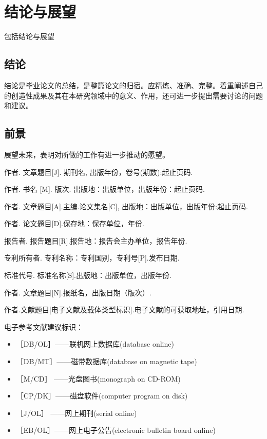 \documentclass[a4paper,fancyhdr,fntef,UTF8,hyperref,openany,oneside,notitlepage]{book}%
\begin{document}
\chapter{结论与展望}
包括结论与展望
\section{结论}
结论是毕业论文的总结，是整篇论文的归宿。应精炼、准确、完整。着重阐述自己的创造性成果及其在本研究领域中的意义、作用，还可进一步提出需要讨论的问题和建议。
\section{前景}
展望未来，表明对所做的工作有进一步推动的愿望。

\clearpage{}
{}
\begin{thebibliography}{00}

   作者. 文章题目[J]. 期刊名, 出版年份，卷号(期数):起止页码.

   作者. 书名 [M]. 版次. 出版地：出版单位，出版年份：起止页码.

   作者. 文章题目[A].主编.论文集名[C], 出版地：出版单位，出版年份:起止页码.

   作者. 论文题目[D].保存地：保存单位，年份.

   报告者. 报告题目[R].报告地：报告会主办单位，报告年份.

   专利所有者. 专利名称：专利国别，专利号[P].发布日期.

   标准代号. 标准名称[S].出版地：出版单位，出版年份.

   作者. 文章题目[N].报纸名，出版日期（版次）.

   作者.文献题目[电子文献及载体类型标识].电子文献的可获取地址，引用日期.


\end{thebibliography}
\par
电子参考文献建议标识：
\begin{itemize}
  \item ［DB/OL］——联机网上数据库(database online)
  \item ［DB/MT］——磁带数据库(database on magnetic tape)
  \item ［M/CD］ ——光盘图书(monograph on CD-ROM)
  \item ［CP/DK］——磁盘软件(computer program on disk)
  \item ［J/OL］ ——网上期刊(serial online)
  \item ［EB/OL］——网上电子公告(electronic bulletin board online)
\end{itemize}
\end{document}
